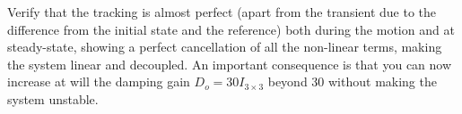 \documentclass[11pt]{article}
\begin{document}
Verify that the tracking is almost perfect (apart from the transient due to the difference from the initial state and the reference) both during the motion and at steady-state, showing a perfect cancellation of all the non-linear terms, making the system linear and decoupled. 
An important consequence is that you can now increase at will the damping gain  $D_o = 30I_{3\times3}$ beyond 30 without making the system unstable.

 
\end{document}
